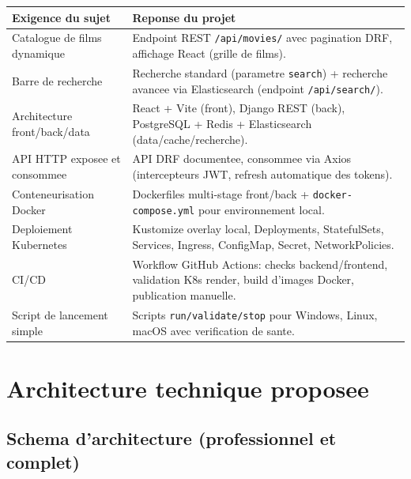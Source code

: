 \documentclass[11pt,a4paper]{article}
\begin{document}
\begin{longtable}{p{} p{}}
\toprule
\textbf{Exigence du sujet} & \textbf{Reponse du projet} \\
\midrule
\endhead
Catalogue de films dynamique & Endpoint REST \texttt{/api/movies/} avec pagination DRF, affichage React (grille de films). \\
Barre de recherche & Recherche standard (parametre \texttt{search}) + recherche avancee via Elasticsearch (endpoint \texttt{/api/search/}). \\
Architecture front/back/data & React + Vite (front), Django REST (back), PostgreSQL + Redis + Elasticsearch (data/cache/recherche). \\
API HTTP exposee et consommee & API DRF documentee, consommee via Axios (intercepteurs JWT, refresh automatique des tokens). \\
Conteneurisation Docker & Dockerfiles multi-stage front/back + \texttt{docker-compose.yml} pour environnement local. \\
Deploiement Kubernetes & Kustomize overlay local, Deployments, StatefulSets, Services, Ingress, ConfigMap, Secret, NetworkPolicies. \\
CI/CD & Workflow GitHub Actions: checks backend/frontend, validation K8s render, build d'images Docker, publication manuelle. \\
Script de lancement simple & Scripts \texttt{run/validate/stop} pour Windows, Linux, macOS avec verification de sante. \\
\bottomrule
\end{longtable}

\section{Architecture technique proposee}

\subsection{Schema d'architecture (professionnel et complet)}
\end{document}
